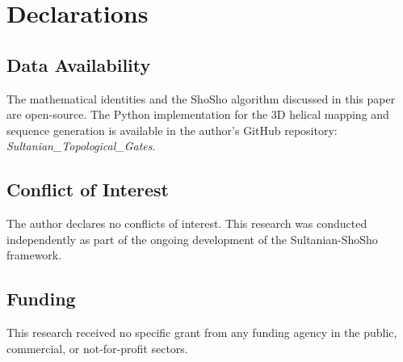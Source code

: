 \documentclass[11pt,a4paper]{article}
\begin{document}
\section*{Declarations}

\subsection*{Data Availability}
The mathematical identities and the ShoSho algorithm discussed in this paper are open-source. The Python implementation for the 3D helical mapping and sequence generation is available in the author's GitHub repository: \textit{Sultanian\_Topological\_Gates}.

\subsection*{Conflict of Interest}
The author declares no conflicts of interest. This research was conducted independently as part of the ongoing development of the Sultanian-ShoSho framework.

\subsection*{Funding}
This research received no specific grant from any funding agency in the public, commercial, or not-for-profit sectors.
\end{document}
